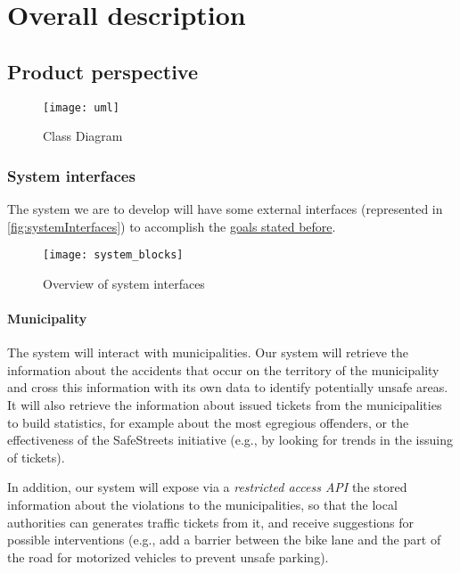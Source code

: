 \section{Overall description}

\subsection{Product perspective}
	
	\begin{figure}[h]
			\centering
			\texttt{[image: uml]}
			\caption{
				\label{fig:systemInterfaces} 
				Class Diagram
			}
		\end{figure}

	\subsubsection{System interfaces}
	\label{sec:systemInterfaces}
		The system we are to develop will have some external interfaces (represented in \autoref{fig:systemInterfaces}) to accomplish the \hyperref[sec:goals]{goals stated before}.
		\begin{figure}[h]
			\centering
			\texttt{[image: system\_blocks]}
			\caption{
				\label{fig:systemInterfaces} 
				Overview of system interfaces
			}
		\end{figure}
	\paragraph{Municipality}
	The system will interact with municipalities. Our system will retrieve the information about the accidents that occur on the territory of the municipality and cross this information with its own data to identify potentially unsafe areas. It will also retrieve the information about issued tickets from the municipalities to build statistics, for example about the most egregious offenders, or the effectiveness of the SafeStreets initiative (e.g., by looking for trends in the issuing of tickets).
	
	 In addition, our system will expose via a \emph{restricted access API} the stored information about the violations to the municipalities, so that the local authorities can generates traffic tickets from it, and receive suggestions for possible interventions (e.g., add a barrier between the bike lane and the part of the road for motorized vehicles to prevent unsafe parking). 
	 
